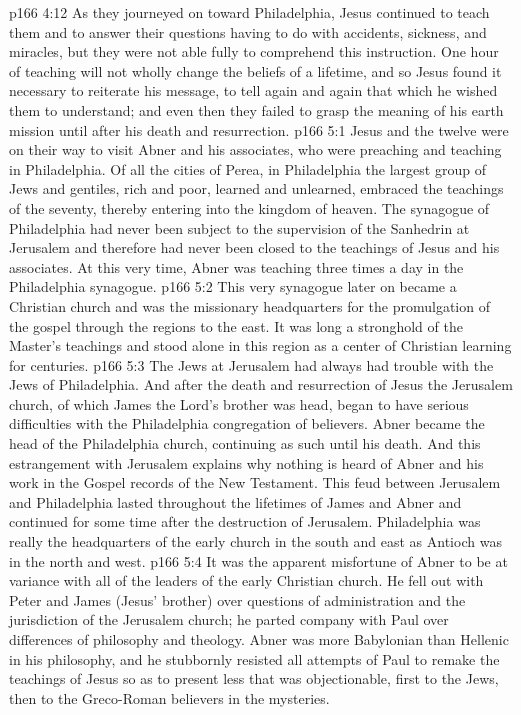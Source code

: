\pc \vs p166 4:12 As they journeyed on toward Philadelphia, Jesus continued to teach them and to answer their questions having to do with accidents, sickness, and miracles, but they were not able fully to comprehend this instruction. One hour of teaching will not wholly change the beliefs of a lifetime, and so Jesus found it necessary to reiterate his message, to tell again and again that which he wished them to understand; and even then they failed to grasp the meaning of his earth mission until after his death and resurrection.\plusone
{}
\vs p166 5:1 Jesus and the twelve were on their way to visit Abner and his associates, who were preaching and teaching in Philadelphia. Of all the cities of Perea, in Philadelphia the largest group of Jews and gentiles, rich and poor, learned and unlearned, embraced the teachings of the seventy, thereby entering into the kingdom of heaven. The synagogue of Philadelphia had never been subject to the supervision of the Sanhedrin at Jerusalem and therefore had never been closed to the teachings of Jesus and his associates. At this very time, Abner was teaching three times a day in the Philadelphia synagogue.
\vs p166 5:2 This very synagogue later on became a Christian church and was the missionary headquarters for the promulgation of the gospel through the regions to the east. It was long a stronghold of the Master’s teachings and stood alone in this region as a center of Christian learning for centuries.
\vs p166 5:3 The Jews at Jerusalem had always had trouble with the Jews of Philadelphia. And after the death and resurrection of Jesus the Jerusalem church, of which James the Lord’s brother was head, began to have serious difficulties with the Philadelphia congregation of believers. Abner became the head of the Philadelphia church, continuing as such until his death. And this estrangement with Jerusalem explains why nothing is heard of Abner and his work in the Gospel records of the New Testament. This feud between Jerusalem and Philadelphia lasted throughout the lifetimes of James and Abner and continued for some time after the destruction of Jerusalem. Philadelphia was really the headquarters of the early church in the south and east as Antioch was in the north and west.
\pc \vs p166 5:4 It was the apparent misfortune of Abner to be at variance with all of the leaders of the early Christian church. He fell out with Peter and James (Jesus’ brother) over questions of administration and the jurisdiction of the Jerusalem church; he parted company with Paul over differences of philosophy and theology. Abner was more Babylonian than Hellenic in his philosophy, and he stubbornly resisted all attempts of Paul to remake the teachings of Jesus so as to present less that was objectionable, first to the Jews, then to the Greco\hyp{}Roman believers in the mysteries.\plusone
